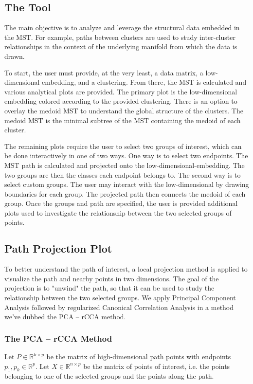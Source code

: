 \documentclass{article}
\begin{document}
\subsection{The Tool}
The main objective is to analyze and leverage the structural data embedded in the MST. For example, paths between clusters are used to study inter-cluster relationships in the context of the underlying manifold from which the data is drawn.

To start, the user must provide, at the very least, a data matrix, a low-dimensional embedding, and a clustering. From there, the MST is calculated and various analytical plots are provided. The primary plot is the low-dimensional embedding colored according to the provided clustering. There is an option to overlay the medoid MST to understand the global structure of the clusters. The medoid MST is the minimal subtree of the MST containing the medoid of each cluster.

The remaining plots require the user to select two groups of interest, which can be done interactively in one of two ways. One way is to select two endpoints. The MST path is calculated and projected onto the low-dimensional-embedding. The two groups are then the classes each endpoint belongs to. The second way is to select custom groups. The user may interact with the low-dimensional by drawing boundaries for each group. The projected path then connects the medoid of each group. Once the groups and path are specified, the user is provided additional plots used to investigate the relationship between the two selected groups of points.

\subsection{Path Projection Plot}
To better understand the path of interest, a local projection method is applied to visualize the path and nearby points in two dimensions. The goal of the projection is to "unwind" the path, so that it can be used to study the relationship between the two selected groups. We apply Principal Component Analysis followed by regularized Canonical Correlation Analysis in a method we've dubbed the PCA -- rCCA method.

\subsubsection{The PCA -- rCCA Method}
Let $P \in \mathbb{R}^{k \times p}$ be the matrix of high-dimensional path points with endpoints $p_1, p_k \in \mathbb{R}^p$. Let $X \in \mathbb{R}^{n \times p}$ be the matrix of points of interest, i.e. the points belonging to one of the selected groups and the points along the path.
\end{document}
